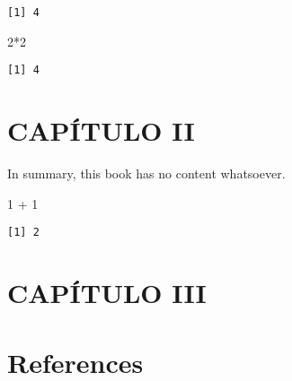 \documentclass[
  letterpaper,
  DIV=11,
  numbers=noendperiod]{scrreprt}
\newenvironment{Shaded}{\begin{snugshade}}{\end{snugshade}}
\newcommand{\DecValTok}[1]{\textcolor[rgb]{0.68,0.00,0.00}{#1}}
\newcommand{\SpecialCharTok}[1]{\textcolor[rgb]{0.37,0.37,0.37}{#1}}
\newlength{\cslhangindent}
\newlength{\cslentryspacingunit} %
\newenvironment{CSLReferences}[2] %
 {%
  \setlength{\parindent}{0pt}
  \ifodd #1
  \let\oldpar\par
  \def\par{\hangindent=\cslhangindent\oldpar}
  \fi
  \setlength{\parskip}{#2\cslentryspacingunit}
 }%
 {}
\begin{document}
\begin{verbatim}
[1] 4
\end{verbatim}

\begin{Shaded}
\begin{Highlighting}[]
\DecValTok{2}\SpecialCharTok{*}\DecValTok{2}
\end{Highlighting}
\end{Shaded}

\begin{verbatim}
[1] 4
\end{verbatim}


\hypertarget{capuxedtulo-ii}{%
\chapter{CAPÍTULO II}\label{capuxedtulo-ii}}

In summary, this book has no content whatsoever.

\begin{Shaded}
\begin{Highlighting}[]
\DecValTok{1} \SpecialCharTok{+} \DecValTok{1}
\end{Highlighting}
\end{Shaded}

\begin{verbatim}
[1] 2
\end{verbatim}


\hypertarget{capuxedtulo-iii}{%
\chapter{CAPÍTULO III}\label{capuxedtulo-iii}}


\hypertarget{references}{%
\chapter*{References}\label{references}}


\hypertarget{refs}{}
\begin{CSLReferences}{0}{0}
\end{CSLReferences}
\end{document}
